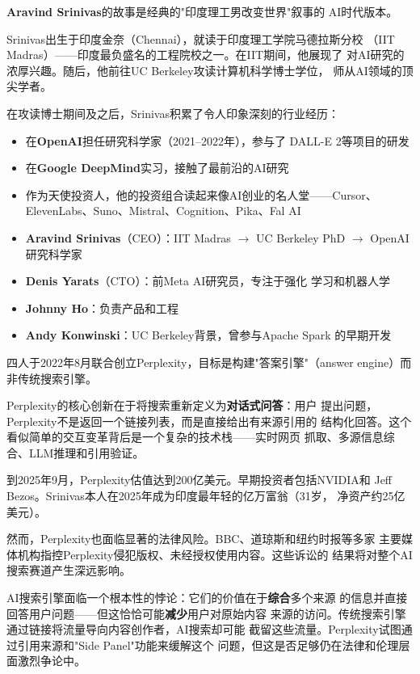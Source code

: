 \textbf{Aravind Srinivas}的故事是经典的"印度理工男改变世界"叙事的
AI时代版本。

Srinivas出生于印度金奈（Chennai），就读于印度理工学院马德拉斯分校
（IIT Madras）——印度最负盛名的工程院校之一。在IIT期间，他展现了
对AI研究的浓厚兴趣。随后，他前往UC Berkeley攻读计算机科学博士学位，
师从AI领域的顶尖学者。

在攻读博士期间及之后，Srinivas积累了令人印象深刻的行业经历：

\begin{itemize}
  \item 在\textbf{OpenAI}担任研究科学家（2021--2022年），参与了
    DALL-E 2等项目的研发
  \item 在\textbf{Google DeepMind}实习，接触了最前沿的AI研究
  \item 作为天使投资人，他的投资组合读起来像AI创业的名人堂——Cursor、
    ElevenLabs、Suno、Mistral、Cognition、Pika、Fal AI
\end{itemize}

\begin{corebox}
\begin{itemize}
  \item \textbf{Aravind Srinivas}（CEO）：IIT Madras $\to$ UC Berkeley
    PhD $\to$ OpenAI研究科学家
  \item \textbf{Denis Yarats}（CTO）：前Meta AI研究员，专注于强化
    学习和机器人学
  \item \textbf{Johnny Ho}：负责产品和工程
  \item \textbf{Andy Konwinski}：UC Berkeley背景，曾参与Apache Spark
    的早期开发
\end{itemize}
四人于2022年8月联合创立Perplexity，目标是构建"答案引擎"（answer
engine）而非传统搜索引擎。
\end{corebox}

Perplexity的核心创新在于将搜索重新定义为\textbf{对话式问答}：用户
提出问题，Perplexity不是返回一个链接列表，而是直接给出有来源引用的
结构化回答。这个看似简单的交互变革背后是一个复杂的技术栈——实时网页
抓取、多源信息综合、LLM推理和引用验证。

到2025年9月，Perplexity估值达到200亿美元。早期投资者包括NVIDIA和
Jeff Bezos。Srinivas本人在2025年成为印度最年轻的亿万富翁（31岁，
净资产约25亿美元）。

然而，Perplexity也面临显著的法律风险。BBC、道琼斯和纽约时报等多家
主要媒体机构指控Perplexity侵犯版权、未经授权使用内容。这些诉讼的
结果将对整个AI搜索赛道产生深远影响。

\begin{whybox}[AI搜索的版权困境]
AI搜索引擎面临一个根本性的悖论：它们的价值在于\textbf{综合}多个来源
的信息并直接回答用户问题——但这恰恰可能\textbf{减少}用户对原始内容
来源的访问。传统搜索引擎通过链接将流量导向内容创作者，AI搜索却可能
截留这些流量。Perplexity试图通过引用来源和"Side Panel"功能来缓解这个
问题，但这是否足够仍在法律和伦理层面激烈争论中。
\end{whybox}

